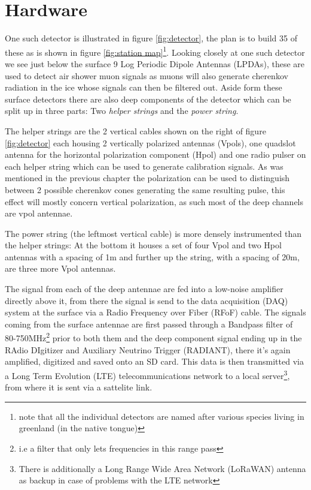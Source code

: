 \documentclass[11pt,a4paper,faculty=we,language=en,doctype=report]{cls/ugent-doc}
\begin{document}
\section{Hardware}
One such detector is illustrated in figure \ref{fig:detector}, the plan is to
build 35 of these as is shown in figure \ref{fig:station map}\footnote{note
that all the individual detectors are named after various species living in
greenland (in the native tongue)}. Looking closely at one such detector we see
just below the surface 9 Log Periodic Dipole Antennas (LPDAs), these are used
to detect air shower muon signals as muons will also generate cherenkov
radiation in the ice whose signals can then be filtered out.  Aside form these
surface detectors there are also deep components of the detector which can be
split up in three parts: Two \textit{helper strings} and the \textit{power
string}.

The helper strings are the 2 vertical cables shown on the right of figure
\ref{fig:detector} each housing 2 vertically polarized antennas (Vpols), one
quadslot antenna for the horizontal polarization component (Hpol) and one radio
pulser on each helper string which can be used to generate calibration signals.
As was mentioned in the previous chapter the polarization can be used to
distinguish between 2 possible cherenkov cones generating the same resulting
pulse, this effect will mostly concern vertical polarization, as such most
of the deep channels are vpol antennae.

The power string (the leftmost vertical cable) is more densely instrumented
than the helper strings: At the bottom it houses a set of four Vpol and two
Hpol antennas with a spacing of 1m and further up the string, with a spacing of
20m, are three more Vpol antennas.

The signal from each of the deep antennae are fed into a low-noise amplifier
directly above it, from there the signal is send to the data acquisition (DAQ)
system at the surface via a Radio Frequency over Fiber (RFoF) cable.  The
signals coming from the surface antennae are first passed through a Bandpass
filter of 80-750MHz\footnote{i.e a filter that only lets frequencies in this
range pass} prior to both them and the deep component signal ending up in the
RAdio DIgitizer and Auxiliary Neutrino Trigger (RADIANT), there it's again
amplified, digitized and saved onto an SD card. This data is then transmitted
via a Long Term Evolution (LTE) telecommunications network to a local
server\footnote{There is additionally a Long Range Wide Area Network (LoRaWAN)
antenna as backup in case of problems with the LTE network}, from where it is
sent via a sattelite link.
\end{document}

